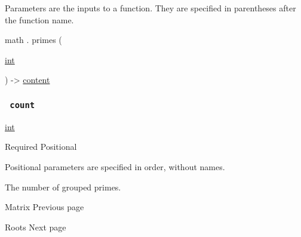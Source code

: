 \label{parameters-tooltip}
Parameters are the inputs to a function. They are specified in
parentheses after the function name.

math { . } { primes } (

{ \href{/docs/reference/foundations/int/}{int} }

) -\textgreater{} \href{/docs/reference/foundations/content/}{content}

\subsubsection{\texorpdfstring{\texttt{\ count\ }}{ count }}\label{parameters-count}

\href{/docs/reference/foundations/int/}{int}

{Required} {{ Positional }}

\label{parameters-count-positional-tooltip}
Positional parameters are specified in order, without names.

The number of grouped primes.

\href{/docs/reference/math/mat/}{\pandocbounded{}}

{ Matrix } { Previous page }

\href{/docs/reference/math/roots/}{\pandocbounded{}}

{ Roots } { Next page }
